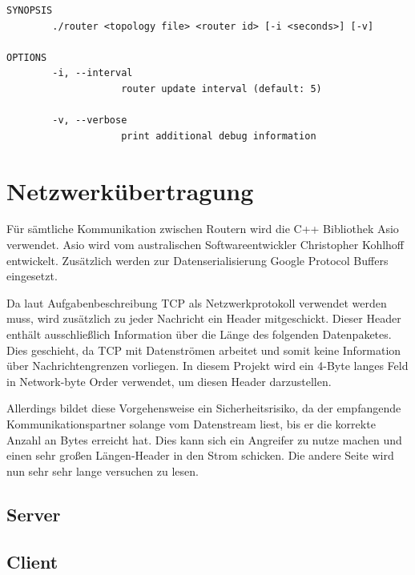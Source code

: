 \documentclass[a4paper,ngerman]{article}
\begin{document}
\begin{Verbatim}
SYNOPSIS
        ./router <topology file> <router id> [-i <seconds>] [-v]

OPTIONS
        -i, --interval
                    router update interval (default: 5)

        -v, --verbose
                    print additional debug information
\end{Verbatim}

\section{Netzwerkübertragung}


Für sämtliche Kommunikation zwischen Routern wird die C++ Bibliothek Asio verwendet. Asio wird vom australischen Softwareentwickler Christopher Kohlhoff entwickelt. Zusätzlich werden zur Datenserialisierung Google Protocol Buffers eingesetzt.

Da laut Aufgabenbeschreibung TCP als Netzwerkprotokoll verwendet werden muss, wird zusätzlich zu jeder Nachricht ein Header mitgeschickt. Dieser Header enthält ausschließlich Information über die Länge des folgenden Datenpaketes. Dies geschieht, da TCP mit Datenströmen arbeitet und somit keine Information über Nachrichtengrenzen vorliegen. In diesem Projekt wird ein 4-Byte langes Feld in Network-byte Order verwendet, um diesen Header darzustellen.

Allerdings bildet diese Vorgehensweise ein Sicherheitsrisiko, da der empfangende Kommunikationspartner solange vom Datenstream liest, bis er die korrekte Anzahl an Bytes erreicht hat. Dies kann sich ein Angreifer zu nutze machen und einen sehr großen Längen-Header in den Strom schicken. Die andere Seite wird nun sehr sehr lange versuchen zu lesen.

\subsection{Server}

\subsection{Client}
\end{document}
